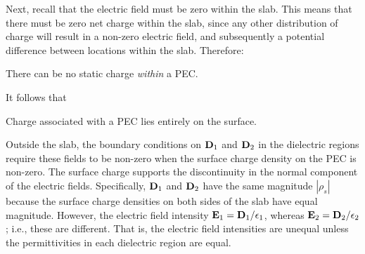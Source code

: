 Next, recall that the electric field must be zero within the slab. 
This means that there must be zero net charge within the slab, since any other distribution of charge will result in a non-zero electric field, and subsequently a potential difference between locations within the slab. 
Therefore:
%
\begin{mdframed}[backgroundcolor=yellow!20,nobreak=true] 
There can be no static charge \emph{within} a PEC. 
\end{mdframed}
%
It follows that
%
\begin{mdframed}[backgroundcolor=yellow!20,nobreak=true] 
Charge associated with a PEC lies entirely on the surface. 
\end{mdframed}

Outside the slab, the boundary conditions on ${\bf D}_1$ and ${\bf D}_2$ in the dielectric regions require these fields to be non-zero when the surface charge density on the PEC is non-zero.
The surface charge supports the discontinuity in the normal component of the electric fields.
Specifically, ${\bf D}_1$ and ${\bf D}_2$ have the same magnitude $\left|\rho_s\right|$ because the surface charge densities on both sides of the slab have equal magnitude.
However, the electric field intensity ${\bf E}_1={\bf D}_1/\epsilon_1$, whereas ${\bf E}_2={\bf D}_2/\epsilon_2$; i.e., these are different.
That is, the electric field intensities are unequal unless the permittivities in each dielectric region are equal.

%


